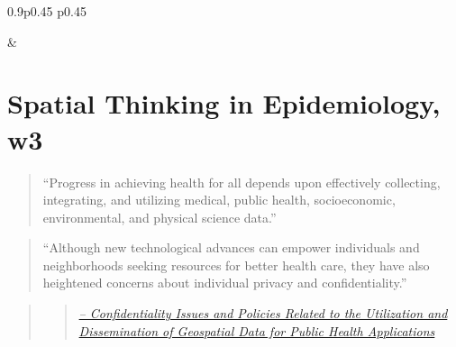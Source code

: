 \documentclass[
]{book}
\begin{document}
\begin{table}[ht]
\begin{centerbox}
\begin{threeparttable}
\begin{tabularx}{0.9\textwidth}{p{} p{}}

 &
 \tabularnewline[-0.5pt]


\end{tabularx}
\end{threeparttable}\par\end{centerbox}

\end{table}
 

\hypertarget{spatial-thinking-in-epidemiology-w3}{%
\section{Spatial Thinking in Epidemiology, w3}\label{spatial-thinking-in-epidemiology-w3}}

\begin{quote}
``Progress in achieving health for all depends upon effectively collecting, integrating, and
utilizing medical, public health, socioeconomic, environmental, and physical science data.''
\end{quote}

\begin{quote}
``Although new technological advances can empower individuals and neighborhoods seeking
resources for better health care, they have also heightened concerns about individual privacy
and confidentiality.''
\end{quote}

\begin{quote}
\begin{quote}
\href{http://www.ciesin.columbia.edu/pdf/SEDAC_ConfidentialityReport.pdf}{\emph{-- Confidentiality Issues and Policies Related to the Utilization and Dissemination of Geospatial Data for Public Health Applications}}
\end{quote}
\end{quote}
\end{document}
